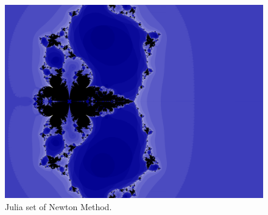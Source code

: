\documentclass[english,11pt]{article} %
\begin{document}
\begin{figure}
\centering
  \includegraphics[scale=1]{"../Experiments/Fractals/Newton Method/high_resolution_MP_null"}
\caption{Julia set of Newton Method.}
\label{fig1}
\end{figure}



\end{document}
